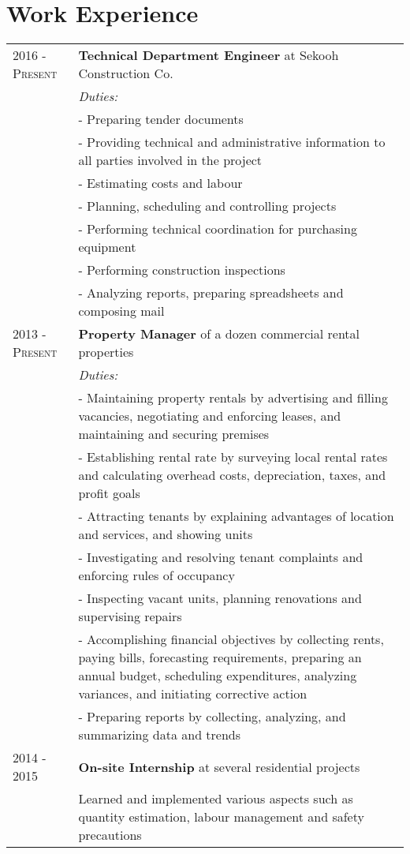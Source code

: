 \documentclass[a4paper,10pt]{article}
\begin{document}
\section{Work Experience}
\begin{tabular}{l|p{11.25cm}}
    \textsc{2016 - Present} & \textbf{Technical Department Engineer} at Sekooh Construction Co.\\
    & \footnotesize{\textit{Duties:}}\\
    & \footnotesize{- Preparing tender documents}\\
    & \footnotesize{- Providing technical and administrative information to all parties involved in the project}\\
    & \footnotesize{- Estimating costs and labour}\\
    & \footnotesize{- Planning, scheduling and controlling projects}\\
    & \footnotesize{- Performing technical coordination for purchasing equipment}\\
    & \footnotesize{- Performing construction inspections}\\
    & \footnotesize{- Analyzing reports, preparing spreadsheets and composing mail}
    \multicolumn{2}{c}{}\\
    \textsc{2013 - Present} & \textbf{Property Manager} of a dozen commercial rental properties\\
    & \footnotesize{\textit{Duties:}}\\
    & \footnotesize{- Maintaining property rentals by advertising and filling vacancies, negotiating and enforcing leases, and maintaining and securing premises}\\
    & \footnotesize{- Establishing rental rate by surveying local rental rates and calculating overhead costs,  depreciation, taxes, and profit goals}\\
    & \footnotesize{- Attracting tenants by explaining advantages of location and services, and showing units}\\
    & \footnotesize{- Investigating and resolving tenant complaints and enforcing rules of occupancy}\\
    & \footnotesize{- Inspecting vacant units, planning renovations and supervising repairs}\\
    & \footnotesize{- Accomplishing financial objectives by collecting rents, paying bills, forecasting requirements, preparing an annual budget, scheduling expenditures, analyzing variances, and initiating corrective action}\\
    & \footnotesize{- Preparing reports by collecting, analyzing, and summarizing data and trends}
    \multicolumn{2}{c}{}\\
    \textsc{2014 - 2015} & \textbf{On-site Internship} at several residential projects\\
    & \footnotesize{Learned and implemented various aspects such as quantity estimation, labour management and safety precautions}
\end{tabular}
\\
\end{document}
